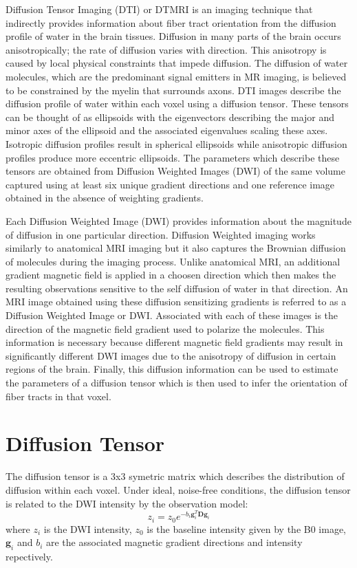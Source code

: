 Diffusion Tensor Imaging (DTI) or DTMRI is an imaging technique that indirectly provides information about fiber tract orientation from the diffusion profile of water in the brain tissues. Diffusion in many parts of the brain occurs anisotropically; the rate of diffusion varies with direction.  This anisotropy is caused by local physical constraints that impede diffusion.  The diffusion of water molecules, which are the predominant signal emitters in MR imaging, is believed to be constrained by the myelin that surrounds axons.  DTI images describe the diffusion profile of water within each voxel using a diffusion tensor.  These tensors can be thought of as ellipsoids with the eigenvectors describing the major and minor axes of the ellipsoid and the associated eigenvalues scaling these axes.  Isotropic diffusion profiles result in spherical ellipsoids while anisotropic diffusion profiles produce more eccentric ellipsoids.  The parameters which describe these tensors are obtained from Diffusion Weighted Images (DWI) of the same volume captured using at least six unique gradient directions and one reference image obtained in the absence of weighting gradients.

Each Diffusion Weighted Image (DWI) provides information about the magnitude of diffusion in one particular direction.  Diffusion Weighted imaging works similarly to anatomical MRI imaging but it also captures the Brownian diffusion of molecules during the imaging process.  Unlike anatomical MRI, an additional gradient magnetic field is applied in a choosen direction which then makes the resulting observations sensitive to the self diffusion of water in that direction. An MRI image obtained using these diffusion sensitizing gradients is referred to as a Diffusion Weighted Image or DWI.  Associated with each of these images is the direction of the magnetic field gradient used to polarize the molecules.  This information is necessary because different magnetic field gradients may result in significantly different DWI images due to the anisotropy of diffusion in certain regions of the brain.  Finally, this diffusion information can be used to estimate the parameters of a diffusion tensor which is then used to infer the orientation of fiber tracts in that voxel.

\section{Diffusion Tensor}
The diffusion tensor is a 3x3 symetric matrix which describes the distribution of diffusion within each voxel.  Under ideal, noise-free conditions, the diffusion tensor is related to the DWI intensity by the observation model:
\begin{equation} \label{eq:tensormodel}
z_{i}=z_0 e^{-b_i \mathbf{g}_i^T \mathbf{D} \mathbf{g}_i}
\end{equation}
where $z_i$ is the DWI intensity, $z_0$ is the baseline intensity given by the B0 image, $\mathbf{g}_i$ and $b_i$ are the associated magnetic gradient directions and intensity repectively.

